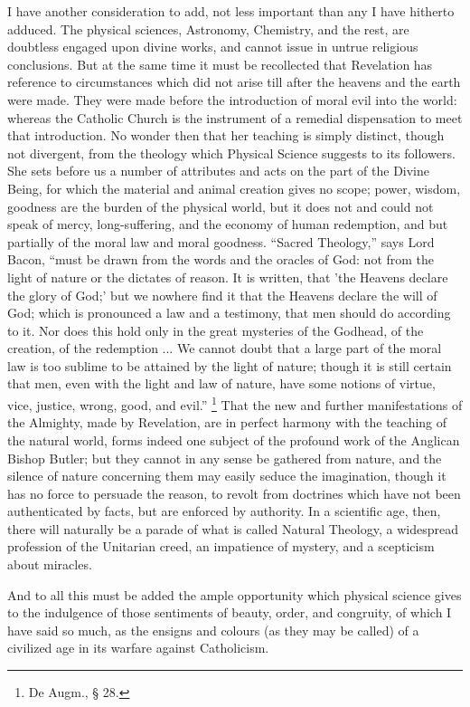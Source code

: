 I have another consideration to add, not less important than any I
have hitherto adduced. The physical sciences, Astronomy, Chemistry,
and the rest, are doubtless engaged upon divine works, and cannot
issue in untrue religious conclusions. But at the same time it must be
recollected that Revelation has reference to circumstances which did
not arise till after the heavens and the earth were made. They were
made before the introduction of moral evil into the world: whereas the
Catholic Church is the instrument of a remedial dispensation to meet
that introduction. No wonder then that her teaching is simply
distinct, though not divergent, from the theology which Physical
Science suggests to its followers. She sets before us a number of
attributes and acts on the part of the Divine Being, for which the
material and animal creation gives no scope; power, wisdom, goodness
are the burden of the physical world, but it does not and could not
speak of mercy, long-suffering, and the economy of human redemption,
and but partially of the moral law and moral goodness. ``Sacred
Theology,'' says Lord Bacon, ``must be drawn from the words
and the oracles of God: not from the light of nature or the dictates
of reason. It is written, that 'the Heavens declare the glory of God;'
but we nowhere find it that the Heavens declare the will of God; which
is pronounced a law and a testimony, that men should do
according to it. Nor does this hold only in the great mysteries of the
Godhead, of the creation, of the redemption ... We cannot doubt that a
large part of the moral law is too sublime to be attained by the light
of nature; though it is still certain that men, even with the light
and law of nature, have some notions of virtue, vice, justice, wrong,
good, and evil.'' \footnote{De Augm., §
28.}
That the new and further manifestations of the Almighty, made by
Revelation, are in perfect harmony with the teaching of the natural
world, forms indeed one subject of the profound work of the Anglican
Bishop Butler; but they cannot in any sense be gathered from nature,
and the silence of nature concerning them may easily seduce the
imagination, though it has no force to persuade the reason, to revolt
from doctrines which have not been authenticated by facts, but are
enforced by authority. In a scientific age, then, there will naturally
be a parade of what is called Natural Theology, a widespread
profession of the Unitarian creed, an impatience of mystery, and a
scepticism about miracles.

And to all this must be added the ample opportunity which physical
science gives to the indulgence of those sentiments of beauty, order,
and congruity, of which I have said so much, as the ensigns and
colours (as they may be called) of a civilized age in its warfare
against Catholicism.

